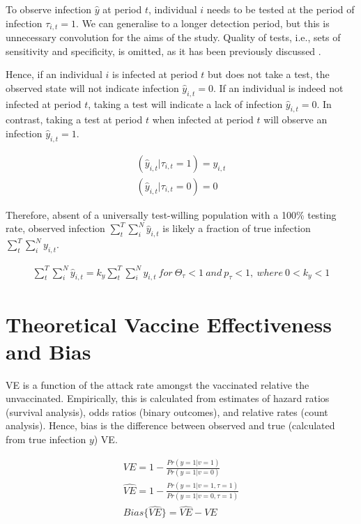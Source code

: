 \documentclass[12pt]{article}
\begin{document}
To observe infection $\hat{y}$ at period $t$, individual $i$ needs to be tested at the period of infection $\tau_{i,t} = 1$. We can generalise to a longer detection period, but this is unnecessary convolution for the aims of the study. Quality of tests, i.e., sets of sensitivity and specificity, is omitted, as it has been previously discussed \citep{jackson2015effects}.

Hence, if an individual $i$ is infected at period $t$ but does not take a test, the observed state will not indicate infection $\hat{y}_{i,t}=0$. If an individual is indeed not infected at period $t$, taking a test will indicate a lack of infection $\hat{y}_{i,t}=0$. In contrast, taking a test at period $t$ when infected at period $t$ will observe an infection $\hat{y}_{i,t}=1$.

\begin{eqnarray}
	(\hat{y}_{i,t} | \tau_{i,t} = 1) = y_{i,t} \\
	(\hat{y}_{i,t} | \tau_{i,t} = 0) = 0
\end{eqnarray}

Therefore, absent of a universally test-willing population with a 100\% testing rate, observed infection $\sum_{t}^{T} \sum_{i}^{N} \hat{y}_{i,t}$ is likely a fraction of true infection $\sum_{t}^{T} \sum_{i}^{N} y_{i,t}$.

\begin{eqnarray}
	\sum_{t}^{T} \sum_{i}^{N} \hat{y}_{i,t} = k_{y} \sum_{t}^{T} \sum_{i}^{N} y_{i,t} \ for \ \Theta_{\tau} < 1 \ and \ p_{\tau} < 1, \ where\  0 < k_{y} < 1
\end{eqnarray}

\section{Theoretical Vaccine Effectiveness and Bias}
VE is a function of the attack rate amongst the vaccinated relative the unvaccinated. Empirically, this is calculated from estimates of hazard ratios (survival analysis), odds ratios (binary outcomes), and relative rates (count analysis). Hence, bias is the difference between observed and true (calculated from true infection $y$) VE.

\begin{eqnarray}
	VE = 1 - \frac{Pr(y=1 | v=1)}{Pr(y=1 | v=0)} \\ 
	\widehat{VE} = 1 - \frac{Pr(y=1 | v=1, \tau = 1)}{Pr(y=1 | v=0, \tau = 1)} \\
	{Bias}\{\widehat{VE}\} = \widehat{VE} - VE
\end{eqnarray}
\end{document}
